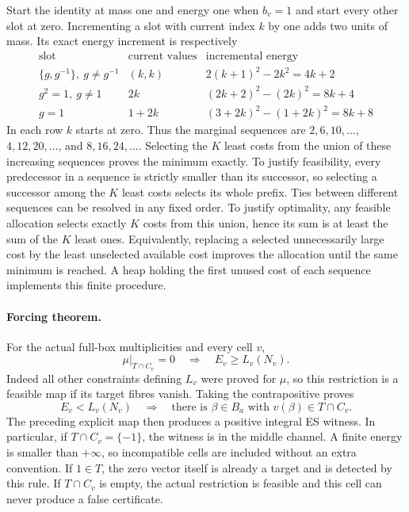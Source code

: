 Start the identity at mass one and energy one when $b_v=1$ and start
every other slot at zero. Incrementing a slot with current index $k$
by one adds two units of mass. Its exact energy increment is respectively
\[
 \begin{array}{c|c|c}
 \text{slot}&\text{current values}&\text{incremental energy}\\\hline
 \{g,g^{-1}\},\ g\ne g^{-1}&(k,k)&2(k+1)^2-2k^2=4k+2\\
 g^2=1,\ g\ne1&2k&(2k+2)^2-(2k)^2=8k+4\\
 g=1&1+2k&(3+2k)^2-(1+2k)^2=8k+8
 \end{array}
\]
In each row $k$ starts at zero. Thus the marginal sequences are
$2,6,10,\ldots$, $4,12,20,\ldots$, and $8,16,24,\ldots$.
Selecting the $K$ least costs from the union of these increasing
sequences proves the minimum exactly. To justify feasibility, every
predecessor in a sequence is strictly smaller than its successor,
so selecting a successor among the $K$ least costs selects its whole
prefix. Ties between different sequences can be resolved in any fixed
order. To justify optimality, any feasible allocation selects exactly
$K$ costs from this union, hence its sum is at least the sum of the
$K$ least ones. Equivalently, replacing a selected unnecessarily large
cost by the least unselected available cost improves the allocation
until the same minimum is reached. A heap holding the first unused
cost of each sequence implements this finite procedure.

\paragraph{Forcing theorem.}
For the actual full-box multiplicities and every cell $v$,
\[
 \mu|_{T\cap C_v}=0\quad\Longrightarrow\quad E_v\geq L_v(N_v).
\]
Indeed all other constraints defining $L_v$ were proved for $\mu$,
so this restriction is a feasible map if its target fibres vanish.
Taking the contrapositive proves
\[
 E_v<L_v(N_v)\quad\Longrightarrow\quad
 \text{there is }\beta\in B_a\text{ with }v(\beta)\in T\cap C_v.
\]
The preceding explicit map then produces a positive integral ES
witness. In particular, if $T\cap C_v=\{-1\}$, the witness is in
the middle channel. A finite energy is smaller than $+\infty$,
so incompatible cells are included without an extra convention.
If $1\in T$, the zero vector itself is already a target and is
detected by this rule. If $T\cap C_v$ is empty, the actual restriction
is feasible and this cell can never produce a false certificate.

